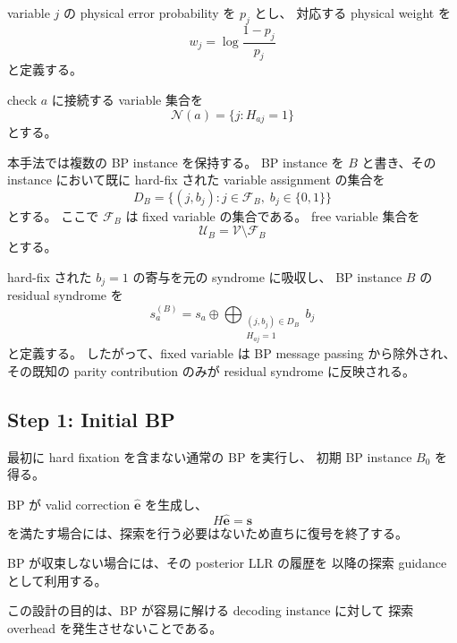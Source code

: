 variable $j$ の physical error probability を $p_j$ とし、
対応する physical weight を
\begin{equation}
    w_j
    =
    \log\frac{1-p_j}{p_j}
\end{equation}
と定義する。

check $a$ に接続する variable 集合を
\begin{equation}
    \mathcal{N}(a)
    =
    \{j:H_{aj}=1\}
\end{equation}
とする。

本手法では複数の BP instance を保持する。
BP instance を $B$ と書き、その instance において既に hard-fix された
variable assignment の集合を
\begin{equation}
    D_B
    =
    \{(j,b_j):j\in\mathcal{F}_B,\;b_j\in\{0,1\}\}
\end{equation}
とする。
ここで $\mathcal{F}_B$ は fixed variable の集合である。
free variable 集合を
\begin{equation}
    \mathcal{U}_B
    =
    \mathcal{V}\setminus\mathcal{F}_B
\end{equation}
とする。

hard-fix された $b_j=1$ の寄与を元の syndrome に吸収し、
BP instance $B$ の residual syndrome を
\begin{equation}
    s_a^{(B)}
    =
    s_a
    \oplus
    \bigoplus_{\substack{(j,b_j)\in D_B\\H_{aj}=1}}
    b_j
\end{equation}
と定義する。
したがって、fixed variable は BP message passing から除外され、
その既知の parity contribution のみが residual syndrome に反映される。


\subsection{Step 1: Initial BP}

最初に hard fixation を含まない通常の BP を実行し、
初期 BP instance $B_0$ を得る。

BP が valid correction $\hat{\bm e}$ を生成し、
\begin{equation}
    H\hat{\bm e}=\bm{s}
\end{equation}
を満たす場合には、探索を行う必要はないため直ちに復号を終了する。

BP が収束しない場合には、その posterior LLR の履歴を
以降の探索 guidance として利用する。

この設計の目的は、BP が容易に解ける decoding instance に対して
探索 overhead を発生させないことである。


